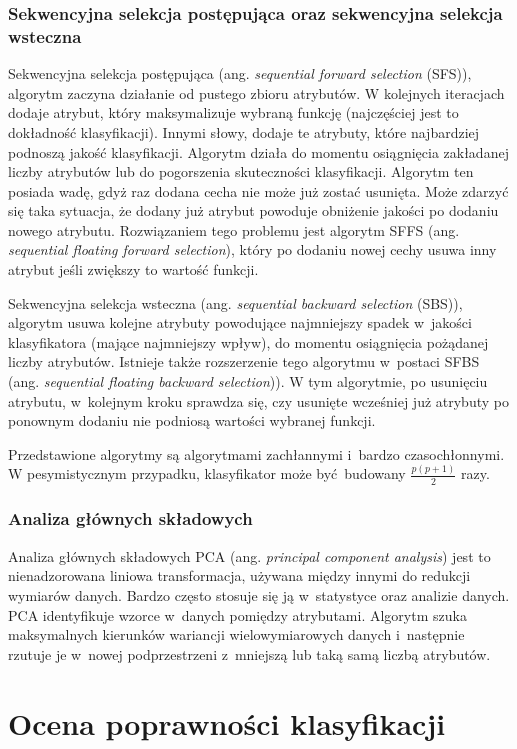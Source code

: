 \subsubsection{Sekwencyjna selekcja postępująca oraz sekwencyjna selekcja wsteczna}
Sekwencyjna selekcja postępująca (ang. \textit{sequential forward selection} (SFS)), algorytm zaczyna działanie od pustego zbioru atrybutów. W kolejnych iteracjach dodaje atrybut, który maksymalizuje wybraną funkcję (najczęściej jest to dokładność klasyfikacji). Innymi słowy, dodaje te atrybuty, które najbardziej podnoszą jakość klasyfikacji. Algorytm działa do momentu osiągnięcia zakładanej liczby atrybutów lub do pogorszenia skuteczności klasyfikacji. Algorytm ten posiada wadę, gdyż raz dodana cecha nie może już zostać usunięta. Może zdarzyć się taka sytuacja, że dodany już atrybut powoduje obniżenie jakości po dodaniu nowego atrybutu. Rozwiązaniem tego problemu jest algorytm SFFS (ang. \textit{sequential floating forward selection}), który po dodaniu nowej cechy usuwa inny atrybut jeśli zwiększy to wartość funkcji. \par
Sekwencyjna selekcja wsteczna (ang. \textit{sequential backward selection} (SBS)), algorytm usuwa kolejne atrybuty powodujące najmniejszy spadek w~jakości klasyfikatora (mające najmniejszy wpływ), do momentu osiągnięcia pożądanej liczby atrybutów. Istnieje także rozszerzenie tego algorytmu w~postaci SFBS (ang. \textit{sequential floating backward selection})). W tym algorytmie, po usunięciu atrybutu, w~kolejnym kroku sprawdza się, czy usunięte wcześniej już atrybuty po ponownym dodaniu nie podniosą wartości wybranej funkcji. \par
Przedstawione algorytmy są algorytmami zachłannymi i~bardzo czasochłonnymi. W pesymistycznym przypadku, klasyfikator może być budowany $\frac{p(p+1)}{2}$ razy.
\subsubsection{Analiza głównych składowych}
Analiza głównych składowych PCA (ang. \textit{principal component analysis}) jest to nienadzorowana liniowa transformacja, używana między innymi do redukcji wymiarów danych. Bardzo często stosuje się ją w~statystyce oraz analizie danych. PCA identyfikuje wzorce w~danych pomiędzy atrybutami. Algorytm szuka maksymalnych kierunków wariancji wielowymiarowych danych i~następnie rzutuje je w~nowej podprzestrzeni z~mniejszą lub taką samą liczbą atrybutów. 

\section{Ocena poprawności klasyfikacji}
